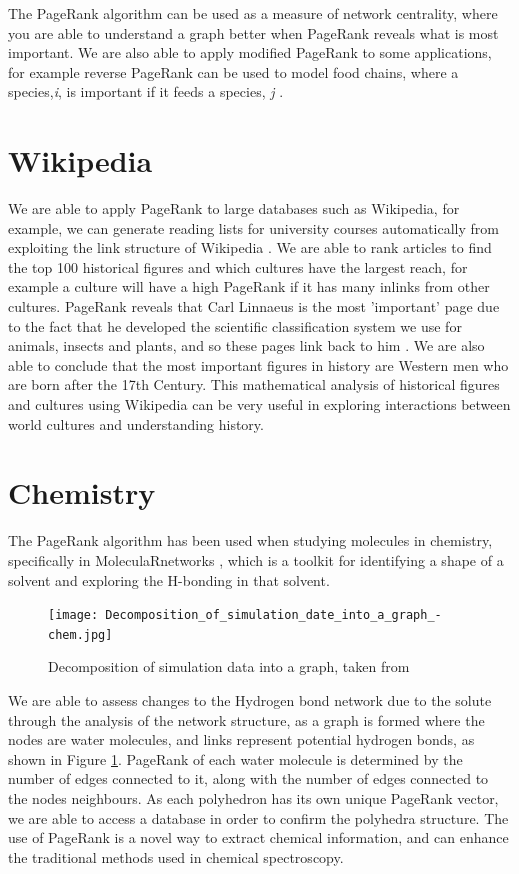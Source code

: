 \documentclass[11pt]{report}
\begin{document}
{The PageRank algorithm can be used as a measure of network centrality, where you are able to understand a graph better when PageRank reveals what is most important. We are also able to apply modified PageRank to some applications, for example reverse PageRank can be used to model food chains, where a species,\textit{i}, is important if it feeds a species, \textit{j} \cite{allesina2009googling}. 

\section{Wikipedia} \label{sec:wiki}
We are able to apply PageRank to large databases such as Wikipedia, for example, we can generate reading lists for university courses automatically from exploiting the link structure of Wikipedia \cite{wissner2006preparation}. We are able to rank articles to find the top 100 historical figures and which cultures have the largest reach, for example a culture will have a high PageRank if it has many inlinks from other cultures. PageRank reveals that Carl Linnaeus is the most 'important' page due to the fact that he developed the scientific classification system we use for animals, insects and plants, and so these pages link back to him \cite{eom2015interactions}. We are also able to conclude that the most important figures in history are Western men who are born after the 17th Century. This mathematical analysis of historical figures and cultures using Wikipedia can be very useful in exploring interactions between world cultures and understanding history.

\section{Chemistry} \label{sec:chem}
The PageRank algorithm has been used when studying molecules in chemistry, specifically in MoleculaRnetworks \cite{JCC:JCC22917}, which is a toolkit for identifying a shape of a solvent and exploring the H-bonding in that solvent. 
\begin{figure}
\texttt{[image: Decomposition\_of\_simulation\_date\_into\_a\_graph\_-chem.jpg]}
\caption{Decomposition of simulation data into a graph, taken from \cite{JCC:JCC22917}}
\label{fig:chem}
\end{figure}
We are able to assess changes to the Hydrogen bond network due to the solute through the analysis of the network structure, as a graph is formed where the nodes are water molecules, and links represent potential hydrogen bonds, as shown in Figure \ref{fig:chem}. PageRank of each water molecule is determined by the number of edges connected to it, along with the number of edges connected to the nodes neighbours. As each polyhedron has its own unique PageRank vector, we are able to access a database in order to confirm the polyhedra structure. The use of PageRank is a novel way to extract chemical information, and can enhance the traditional methods used in chemical spectroscopy.

}
\end{document}
